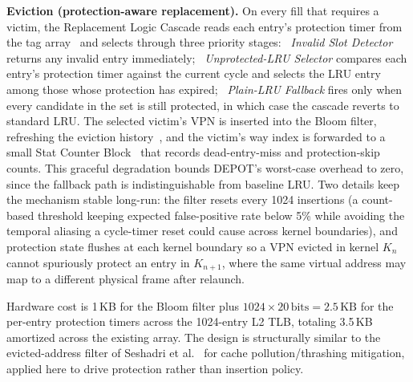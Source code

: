 \noindent\textbf{Eviction (protection-aware replacement).}
On every fill that requires a victim, the Replacement Logic Cascade reads
each entry's protection timer from the tag array~ and selects
through three priority stages:
\emph{~Invalid Slot Detector} returns any invalid entry immediately;
\emph{~Unprotected-LRU Selector} compares each entry's protection timer
against the current cycle and selects the LRU entry among those whose
protection has expired;
\emph{~Plain-LRU Fallback} fires only when every candidate in the set is
still protected, in which case the cascade reverts to standard LRU.
The selected victim's VPN is inserted into the Bloom filter, refreshing the
eviction history~, and the victim's way index is forwarded to
a small Stat Counter Block~ that records dead-entry-miss and
protection-skip counts.
This graceful degradation bounds DEPOT's worst-case overhead to zero, since the
fallback path is indistinguishable from baseline LRU. Two details keep the
mechanism stable long-run: the filter resets every 1024 insertions (a
count-based threshold keeping expected false-positive rate below 5\% while
avoiding the temporal aliasing a cycle-timer reset could cause across kernel
boundaries), and protection state flushes at each kernel boundary so a VPN
evicted in kernel $K_n$ cannot spuriously protect an entry in $K_{n+1}$, where
the same virtual address may map to a different physical frame after relaunch.

Hardware cost is 1\,KB for the Bloom filter plus $1024 \times 20\,\text{bits} =
2.5\,\text{KB}$ for the per-entry protection timers across the 1024-entry L2
TLB, totaling 3.5\,KB amortized across the existing array. The design is
structurally similar to the evicted-address filter of Seshadri et
al.~\cite{evicted_addr_filter} for cache pollution/thrashing mitigation,
applied here to drive protection rather than insertion policy.

